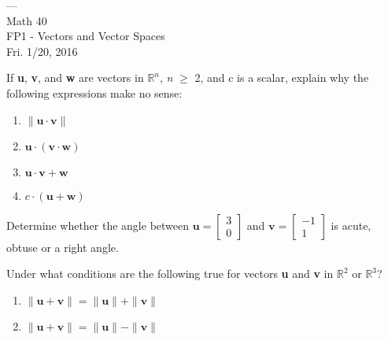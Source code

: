 \documentclass[12pt,letterpaper]{../hmcpset}
\begin{document}
	
	\vspace*{-3\baselineskip}
	\begin{center}
		\begin{flushright} --- \\ Math 40 \\ FP1 - Vectors and Vector Spaces \\ Fri. 1/20, 2016 \\ 
		\end{flushright} 	
	\end{center}
	\bigskip


\begin{problem}[17]
	If \textbf{u}, \textbf{v}, and \textbf{w} are vectors in $\mathbb{R}^n$, \textit{n} $\geq$ 2, and c is a scalar, explain why the following expressions make no sense:
	
	\begin{enumerate}
		\item 
			$\| \mathbf{u} \cdot \mathbf{v} \|$
		\item
			$\mathbf{u} \cdot (\mathbf{v} \cdot \mathbf{w})$
		\item
			$\mathbf{u} \cdot \mathbf{v} + \mathbf{w}$
		\item
			$c \cdot (\mathbf{u} + \mathbf{w})$
	\end{enumerate}
\end{problem}

\begin{solution}
\end{solution}
\newpage

\begin{problem}[18]
	Determine whether the angle between $\mathbf{u} = \begin{bmatrix}
		3 \\
		0
	\end{bmatrix}$ and $\mathbf{v} = \begin{bmatrix}
		-1 \\
		1
	\end{bmatrix}$ is acute, obtuse or a right angle.
\end{problem}

\begin{solution}
\end{solution}
\newpage

\begin{problem}[52]
	Under what conditions are the following true for vectors \textbf{u} and \textbf{v} in $\mathbb{R}^2$ or $\mathbb{R}^3$?
	\begin{enumerate}
		\item 
			$\| \mathbf{u} + \mathbf{v} \| = \| \mathbf{u} \| + \| \mathbf{v} \|$
		\item
			$\| \mathbf{u} + \mathbf{v} \| = \| \mathbf{u} \| - \| \mathbf{v} \|$
	\end{enumerate}
\end{problem}
\end{document}
